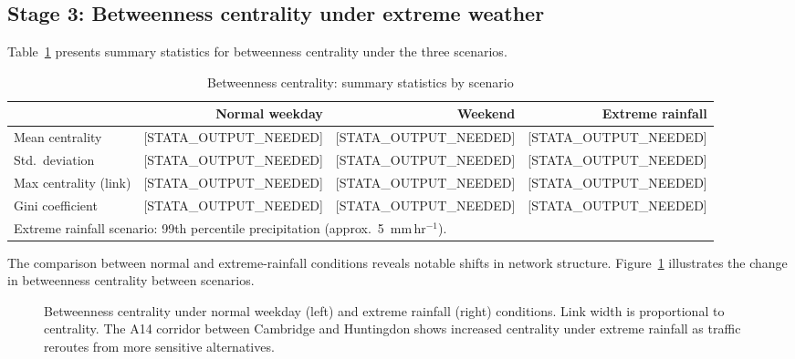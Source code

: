 \documentclass[review]{elsarticle}
\begin{document}
\subsection{Stage 3: Betweenness centrality under extreme weather}
\label{sec:results:centrality}

Table~\ref{tab:centrality} presents summary statistics for betweenness centrality under the three scenarios.

\begin{table}[htbp]
\centering
\caption{Betweenness centrality: summary statistics by scenario}
\label{tab:centrality}
\begin{tabular}{lrrr}
\toprule
 & Normal weekday & Weekend & Extreme rainfall \\
\midrule
Mean centrality & [STATA\_OUTPUT\_NEEDED] & [STATA\_OUTPUT\_NEEDED] & [STATA\_OUTPUT\_NEEDED] \\
Std.\ deviation & [STATA\_OUTPUT\_NEEDED] & [STATA\_OUTPUT\_NEEDED] & [STATA\_OUTPUT\_NEEDED] \\
Max centrality (link) & [STATA\_OUTPUT\_NEEDED] & [STATA\_OUTPUT\_NEEDED] & [STATA\_OUTPUT\_NEEDED] \\
Gini coefficient & [STATA\_OUTPUT\_NEEDED] & [STATA\_OUTPUT\_NEEDED] & [STATA\_OUTPUT\_NEEDED] \\
\bottomrule
\multicolumn{4}{l}{\footnotesize Extreme rainfall scenario: 99th percentile precipitation (approx.\ 5~mm\,hr$^{-1}$).} \\
\end{tabular}
\end{table}

The comparison between normal and extreme-rainfall conditions reveals notable shifts in network structure. Figure~\ref{fig:centrality} illustrates the change in betweenness centrality between scenarios.

\begin{figure}[htbp]
\centering
\caption{Betweenness centrality under normal weekday (left) and extreme rainfall (right) conditions. Link width is proportional to centrality. The A14 corridor between Cambridge and Huntingdon shows increased centrality under extreme rainfall as traffic reroutes from more sensitive alternatives.}
\label{fig:centrality}
\end{figure}
\end{document}
